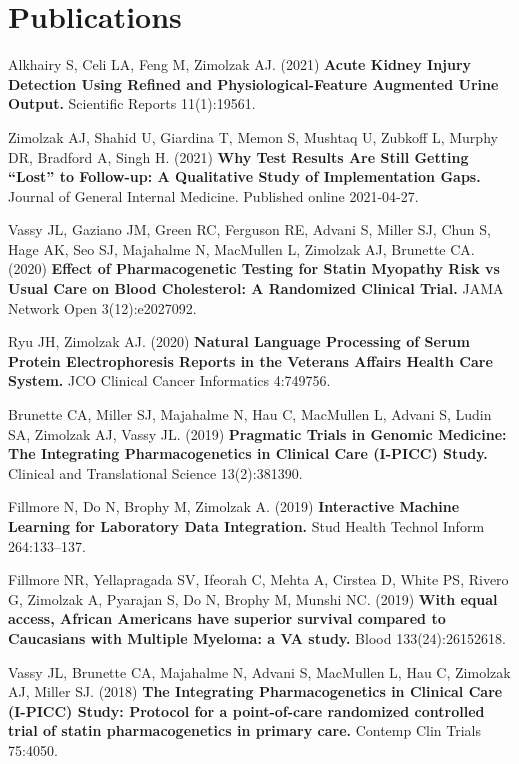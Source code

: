 \documentclass[10pt]{article}
\begin{document}
\section*{Publications}

Alkhairy S, Celi LA, Feng M, Zimolzak AJ. (2021) \textbf{Acute Kidney Injury
Detection Using Refined and Physiological-Feature Augmented Urine
Output.} Scientific Reports 11(1):19561.

Zimolzak AJ, Shahid U, Giardina T, Memon S, Mushtaq U, Zubkoff L,
Murphy DR, Bradford A, Singh H. (2021) \textbf{Why Test Results Are
  Still Getting ``Lost'' to Follow-up: A Qualitative Study of
  Implementation Gaps.} Journal of General Internal Medicine.
Published online 2021-04-27.

Vassy JL, Gaziano JM, Green RC, Ferguson RE, Advani S, Miller SJ, Chun
S, Hage AK, Seo SJ, Majahalme N, MacMullen L, Zimolzak AJ, Brunette
CA. (2020) \textbf{Effect of Pharmacogenetic Testing for Statin
  Myopathy Risk vs Usual Care on Blood Cholesterol: A Randomized
  Clinical Trial.} JAMA Network Open 3(12):e2027092.

Ryu JH, Zimolzak AJ. (2020) \textbf{Natural Language Processing of
  Serum Protein Electrophoresis Reports in the Veterans Affairs Health
  Care System.} JCO Clinical Cancer Informatics 4:749\ndash{}756.

Brunette CA, Miller SJ, Majahalme N, Hau C, MacMullen L, Advani S,
Ludin SA, Zimolzak AJ, Vassy JL. (2019) \textbf{Pragmatic Trials in
  Genomic Medicine: The Integrating Pharmacogenetics in Clinical Care
  (I-PICC) Study.} Clinical and Translational Science
13(2):381\ndash{}390.

Fillmore N, Do N, Brophy M, Zimolzak A. (2019) \textbf{Interactive
  Machine Learning for Laboratory Data Integration.} Stud Health
Technol Inform 264:133--137.

Fillmore NR, Yellapragada SV, Ifeorah C, Mehta A, Cirstea D, White PS,
Rivero G, Zimolzak A, Pyarajan S, Do N, Brophy M, Munshi NC. (2019)
\textbf{With equal access, African Americans have superior survival
  compared to Caucasians with Multiple Myeloma: a VA study.} Blood
133(24):2615\ndash{}2618.

Vassy JL, Brunette CA, Majahalme N, Advani S, MacMullen L, Hau C,
Zimolzak AJ, Miller SJ. (2018) \textbf{The Integrating
  Pharmacogenetics in Clinical Care (I-PICC) Study: Protocol for a
  point-of-care randomized controlled trial of statin pharmacogenetics
  in primary care.} Contemp Clin Trials 75:40\ndash{}50.
\end{document}
